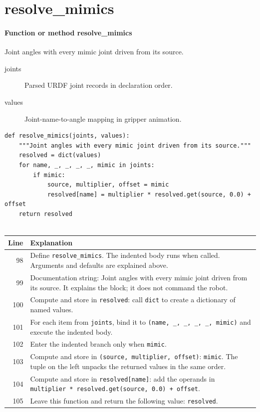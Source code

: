 \documentclass[11pt,a4paper]{book}
\begin{document}
\section{resolve\_mimics}

\paragraph{Function or method resolve\_mimics}
Joint angles with every mimic joint driven from its source.

\begin{description}
\item[joints] Parsed URDF joint records in declaration order.
\item[values] Joint-name-to-angle mapping in gripper animation.
\end{description}

\begin{lstlisting}[firstnumber=98]
def resolve_mimics(joints, values):
    """Joint angles with every mimic joint driven from its source."""
    resolved = dict(values)
    for name, _, _, _, _, mimic in joints:
        if mimic:
            source, multiplier, offset = mimic
            resolved[name] = multiplier * resolved.get(source, 0.0) + offset
    return resolved


\end{lstlisting}

\begin{longtable}{r p{}}

\textbf{Line} & \textbf{Explanation} \\ \hline \endhead

98 & Define \texttt{resolve\_mimics}. The indented body runs when called. Arguments and defaults are explained above. \\

99 & Documentation string: Joint angles with every mimic joint driven from its source. It explains the block; it does not command the robot. \\

100 & Compute and store in \texttt{resolved}: call \texttt{dict} to create a dictionary of named values.  \\

101 & For each item from \texttt{joints}, bind it to \texttt{(name, \_, \_, \_, \_, mimic)} and execute the indented body. \\

102 & Enter the indented branch only when \texttt{mimic}. \\

103 & Compute and store in \texttt{(source, multiplier, offset)}: \texttt{mimic}. The tuple on the left unpacks the returned values in the same order. \\

104 & Compute and store in \texttt{resolved[name]}: add the operands in \texttt{multiplier * resolved.get(source, 0.0) + offset}.  \\

105 & Leave this function and return the following value: \texttt{resolved}. \\

\end{longtable}
\end{document}
